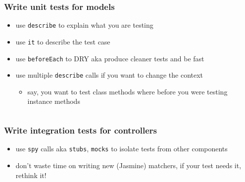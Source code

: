 \documentclass[compress]{beamer}
\begin{document}
\begin{frame}

\frametitle{Write unit tests for models}

\begin{itemize}[<+->]
  \item use \texttt{describe} to explain what you are testing
  \item use \texttt{it} to describe the test case
  \item use \texttt{beforeEach} to DRY aka produce cleaner tests and be fast
  \item use multiple \texttt{describe} calls if you want to change the context
  \begin{itemize}[<+->]
    \item say, you want to test class methods where before you were testing instance methods
  \end{itemize}
\end{itemize}

\inputminted[fontsize=\tiny,gobble=2,linenos=true,firstline=3,lastline=23]{javascript}{code/js/app/test/model/article.js}

\end{frame}

\begin{frame}

\frametitle{Write integration tests for controllers}

\begin{itemize}[<+->]
  \item use \texttt{spy} calls aka \texttt{stubs}, \texttt{mocks} to isolate tests from other components
  \item don't waste time on writing new (Jasmine) matchers, if your test needs it, rethink it!
\end{itemize}

\inputminted[fontsize=\tiny,gobble=2,linenos=true,firstline=6,lastline=29]{javascript}{code/js/app/test/controller/publish.js}

\end{frame}
\end{document}
